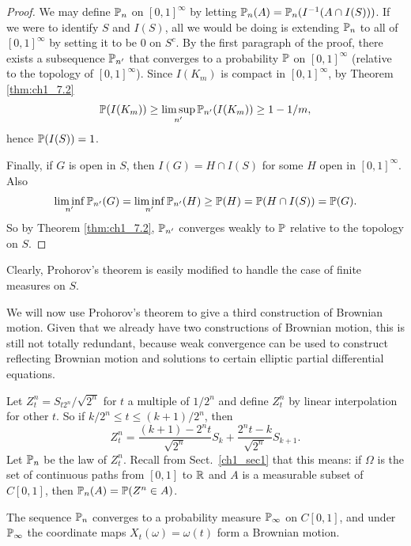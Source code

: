 \begin{proof}
We may define $\P_n$ on $[0,1]^\infty$ by letting $\P_n(A) = \P_n(I^{-1}(A \cap I(S)))$. If we were to identify $S$ and $I(S)$, all we would be doing is extending $\P_n$ to all of $[0,1]^\infty$ by setting it to be $0$ on $S^c$. By the first paragraph of the proof, there exists a subsequence $\P_{n'}$ that converges to a probability $\P$ on $[0,1]^\infty$ (relative to the topology of $[0,1]^\infty$). Since $I(K_m)$ is compact in $[0,1]^\infty$, by Theorem \ref{thm:ch1_7.2}
\[
    \P(I(K_m)) \geq \limsup_{n'} \P_{n'}(I(K_m)) \geq 1-1/m,
\]
hence $\P(I(S)) = 1$.


Finally, if $G$ is open in $S$, then $I(G) = H \cap I(S)$ for some $H$ open in $[0,1]^\infty$. Also
\[
    \liminf_{n'} \P_{n'}(G) = \liminf_{n'} \P_{n'}(H) \geq \P(H) = \P(H \cap I(S)) = \P(G).
\]
So by Theorem \ref{thm:ch1_7.2}, $\P_{n'}$ converges weakly to $\P$ relative to the topology on $S$.
\end{proof}

Clearly, Prohorov's theorem is easily modified to handle the case of finite measures on $S$.



We will now use Prohorov's theorem to give a third construction of Brownian motion. Given that we already have two constructions of Brownian motion, this is still not totally redundant, because weak convergence can be used to construct reflecting Brownian motion and solutions to certain elliptic partial differential equations.

Let $Z_t^n = S_{t2^n}/\sqrt{2^n}$ for $t$ a multiple of $1/2^n$ and define $Z_t^n$ by linear interpolation for other $t$. So if $k/2^n \leq t \leq (k+1)/2^n$, then
\begin{equation}\label{eq:ch1_7.3}
    Z_t^n = \frac{(k+1) - 2^nt}{\sqrt{2^n}}S_k + \frac{2^nt - k}{\sqrt{2^n}}S_{k+1}.
\end{equation}
Let $\P_n$ be the law of $Z_t^n$. Recall from Sect.\ \ref{ch1_sec1} that this means: if $\Omega$ is the set of continuous paths from $[0,1]$ to $\R$ and $A$ is a measurable subset of $C[0,1]$, then $\P_n(A) = \P(Z^n \in A)$.

\begin{theorem}\label{thm:ch1_7.5}
The sequence $\P_n$ converges to a probability measure $\P_\infty$ on $C[0,1]$, and under $\P_\infty$ the coordinate maps $X_t(\omega) = \omega(t)$ form a Brownian motion.
\end{theorem}

